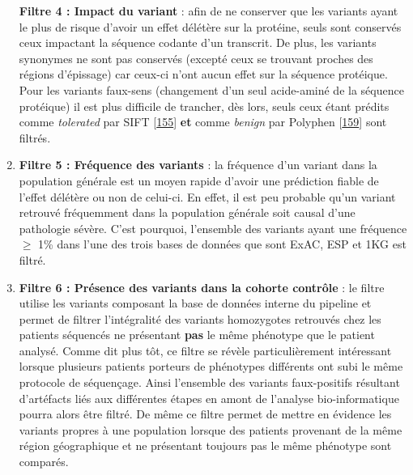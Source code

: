 \documentclass[12pt,a4paper,twoside]{ugathesis}
\theoremstyle{definition}
\theoremstyle{definition}
\theoremstyle{definition}
\theoremstyle{remark}
\begin{document}
\begin{enumerate}
  \textbf{Filtre 4 : Impact du variant} : afin de ne conserver que les
  variants ayant le plus de risque d'avoir un effet délétère sur la
  protéine, seuls sont conservés ceux impactant la séquence codante d'un
  transcrit. De plus, les variants synonymes ne sont pas conservés
  (excepté ceux se trouvant proches des régions d'épissage) car ceux-ci
  n'ont aucun effet sur la séquence protéique. Pour les variants
  faux-sens (changement d'un seul acide-aminé de la séquence protéique)
  il est plus difficile de trancher, dès lors, seuls ceux étant prédits
  comme \emph{tolerated} par SIFT
  {[}\protect\hyperlink{ref-Kumar2009}{155}{]} \textbf{et} comme
  \emph{benign} par Polyphen
  {[}\protect\hyperlink{ref-Adzhubei2010}{159}{]} sont filtrés.
\item
  \textbf{Filtre 5 : Fréquence des variants} : la fréquence d'un variant
  dans la population générale est un moyen rapide d'avoir une prédiction
  fiable de l'effet délétère ou non de celui-ci. En effet, il est peu
  probable qu'un variant retrouvé fréquemment dans la population
  générale soit causal d'une pathologie sévère. C'est pourquoi,
  l'ensemble des variants ayant une fréquence \(\ge\) 1\% dans l'une des
  trois bases de données que sont ExAC, ESP et 1KG est filtré.
\item
  \textbf{Filtre 6 : Présence des variants dans la cohorte contrôle} :
  le filtre utilise les variants composant la base de données interne du
  pipeline et permet de filtrer l'intégralité des variants homozygotes
  retrouvés chez les patients séquencés ne présentant \textbf{pas} le
  même phénotype que le patient analysé. Comme dit plus tôt, ce filtre
  se révèle particulièrement intéressant lorsque plusieurs patients
  porteurs de phénotypes différents ont subi le même protocole de
  séquençage. Ainsi l'ensemble des variants faux-positifs résultant
  d'artéfacts liés aux différentes étapes en amont de l'analyse
  bio-informatique pourra alors être filtré. De même ce filtre permet de
  mettre en évidence les variants propres à une population lorsque des
  patients provenant de la même région géographique et ne présentant
  toujours pas le même phénotype sont comparés.
\end{enumerate}
\end{document}
